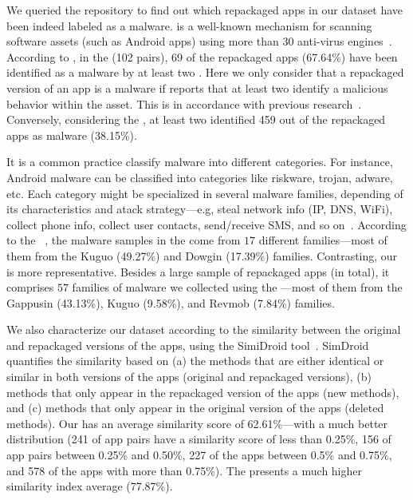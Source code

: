 We queried the \vt repository to find out which repackaged apps in our
dataset have been indeed labeled as a malware. \vt is a well-known mechanism for
scanning software assets (such as Android apps) using more than 30 anti-virus engines~\cite{DBLP:journals/ese/KhanmohammadiEH19}.
According to \vt, in the \sds (102 pairs),
69 of the repackaged apps (67.64\%) have been identified as a malware by at least two
\ses. Here we only consider that a repackaged version of an app is a malware if \vt reports that at least
two \ses identify a malicious behavior within the asset. This is in accordance with previous research~\cite{vt-label,DBLP:journals/ese/KhanmohammadiEH19}. Conversely, considering the \cds, at least two \se identified 459 out of the \apps repackaged apps as malware (38.15\%).

It is a common practice classify malware into different categories. For instance, Android malware can be classified into categories
like riskware, trojan, adware, etc. Each category might be specialized in several malware families, depending of its
characteristics and atack strategy---e.g, steal network info (IP, DNS, WiFi), collect phone info,
collect user contacts, send/receive SMS, and so on~\cite{DBLP:conf/iccns/RahaliLKTGM20}.
According to the
\avt~\cite{avclass2-paper}, the malware samples in the \sds come from $17$ different families---most of them from the Kuguo (49.27\%) and Dowgin (17.39\%) families.
Contrasting, our \cds is more representative. Besides a large sample of repackaged apps (\apps in total), it
comprises $57$ families of malware we collected using the \avt ---most
of them from the Gappusin (43.13\%), Kuguo (9.58\%), and Revmob (7.84\%) families.

We also characterize our dataset according to the similarity
between the original and repackaged versions of the apps, using the  
SimiDroid tool~\cite{DBLP:conf/trustcom/0029BK17}. SimDroid quantifies the similarity
based on (a) the methods that are either identical or similar in both versions of the apps (original and repackaged versions),
(b) methods that only appear in the repackaged version of the apps (new methods), and (c) methods that only appear in the
original version of the apps (deleted methods).
Our \cds has an average similarity score of 62.61\%---with a much better distribution (241 of
app pairs have a similarity score of less than 0.25\%, 156 of app pairs
between 0.25\% and 0.50\%, 227 of the apps between 0.5\% and 0.75\%,
and 578 of the apps with more than 0.75\%). The \sds presents a much higher
similarity index average (77.87\%). 

